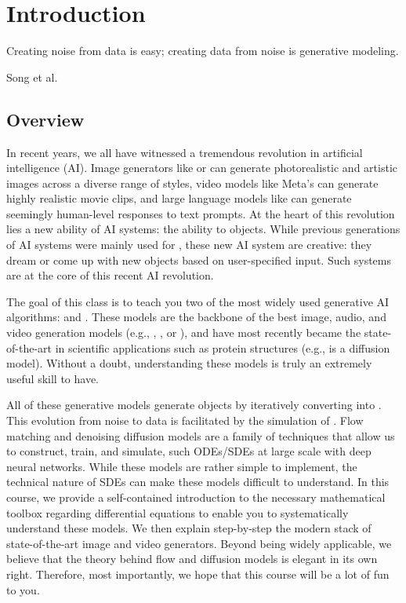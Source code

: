 \section{Introduction}
\label{sec:introduction}
\epigraph{Creating noise from data is easy; creating data from noise is generative modeling.}{Song et al. \cite{yangsong_sde}}


\subsection{Overview}
In recent years, we all have witnessed a tremendous revolution in artificial intelligence (AI). 
Image generators like  or  can generate photorealistic and artistic images across a diverse range of styles, video models like Meta's  can generate highly realistic movie clips, and large language models like  can generate seemingly human-level responses to text prompts. At the heart of this revolution lies a new ability of AI systems: the ability to  objects. While previous generations of AI systems were mainly used for , these new AI system are creative: they dream or come up with new objects based on user-specified input. Such  systems are at the core of this recent AI revolution.  

The goal of this class is to teach you two of the most widely used generative AI algorithms:  \citep{song2020score} and  \citep{lipman2022flow,liu2022flow, albergo2023stochastic, lipman2024flow}. These models are the backbone of the best image, audio, and video generation models (e.g., , , or ), and have most recently became the state-of-the-art in scientific applications such as protein structures (e.g.,  is a diffusion model). Without a doubt, understanding these models is truly an extremely useful skill to have.

All of these generative models generate objects by iteratively converting   into . This evolution from noise to data is facilitated by the simulation of . Flow matching and denoising diffusion models are a family of techniques that allow us to construct, train, and simulate, such ODEs/SDEs at large scale with deep neural networks. While these models are rather simple to implement, the technical nature of SDEs can make these models difficult to understand. In this course, we provide a self-contained introduction to the necessary mathematical toolbox regarding differential equations to enable you to systematically understand these models. We then explain step-by-step the modern stack of state-of-the-art image and video generators. Beyond being widely applicable, we believe that the theory behind flow and diffusion models is elegant in its own right. Therefore, most importantly, we hope that this course will be a lot of fun to you. 

